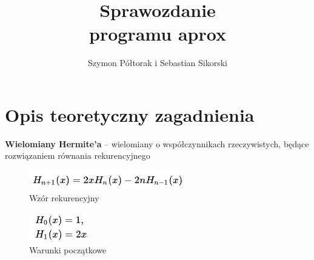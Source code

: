 \documentclass[10pt, a4paper]{report}
\title{\huge{\textbf{Sprawozdanie}} \\ programu aprox}
\author{Szymon Półtorak i Sebastian Sikorski}
\date{}
\begin{document}
    \maketitle

    \renewcommand*\thesection{\arabic{section}} 
    
    \pagestyle{fancy}
    \fancyhf{}
    
    \tableofcontents
    \newpage

    \section{Opis teoretyczny zagadnienia}
    \textbf{Wielomiany Hermite’a} – wielomiany o współczynnikach rzeczywistych, będące rozwiązaniem równania rekurencyjnego 
    \begin{figure}[h]
        \begin{center}
            \includegraphics[scale=0.8]{hermit1.jpg}
            \caption{Wzór rekurencyjny}
        \end{center}
    \end{figure}

    \begin{figure}[h]
        \begin{center}
            \includegraphics[scale=0.8]{hermit2.jpg}
            \caption{Warunki początkowe}
        \end{center}
    \end{figure}
\end{document}
